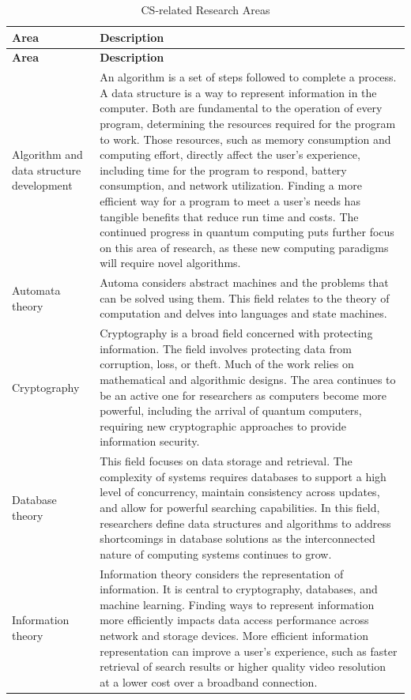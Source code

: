 \begin{longtable}[H]{p{.8in}|p{3.6in}}
	\caption{CS-related Research Areas}
	\label{tab:table1}\\
	\textbf{Area} & \textbf{Description}\\
	\hline
	\endfirsthead
	\textbf{Area} & \textbf{Description}\\
	\endhead
	\Tstrut Algorithm and data structure development & An algorithm is a set of steps followed to complete a process. A data structure is a way to represent information in the computer. Both are fundamental to the operation of every program, determining the resources required for the program to work. Those resources, such as memory consumption and computing effort, directly affect the user's experience, including time for the program to respond, battery consumption, and network utilization. Finding a more efficient way for a program to meet a user's needs has tangible benefits that reduce run time and costs. The continued progress in quantum computing puts further focus on this area of research, as these new computing paradigms will require novel algorithms.\\
	\hline
	\Tstrut Automata theory & Automa considers abstract machines and the problems that can be solved using them. This field relates to the theory of computation and delves into languages and state machines. \\
	\hline
	\Tstrut Cryptography & Cryptography is a broad field concerned with protecting information. The field involves protecting data from corruption, loss, or theft. Much of the work relies on mathematical and algorithmic designs. The area continues to be an active one for researchers as computers become more powerful, including the arrival of quantum computers, requiring new cryptographic approaches to provide information security.\\
	\hline
	\Tstrut Database theory & This field focuses on data storage and retrieval. The complexity of systems requires databases to support a high level of concurrency, maintain consistency across updates, and allow for powerful searching capabilities. In this field, researchers define data structures and algorithms to address shortcomings in database solutions as the interconnected nature of computing systems continues to grow.\\
	\hline
	\Tstrut Information theory & Information theory considers the representation of information. It is central to cryptography, databases, and machine learning. Finding ways to represent information more efficiently impacts data access performance across network and storage devices. More efficient information representation can improve a user's experience, such as faster retrieval of search results or higher quality video resolution at a lower cost over a broadband connection.\\

\end{longtable}
